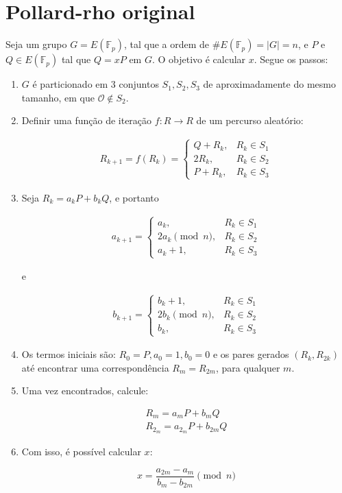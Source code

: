 \section{Pollard-rho original}
Seja um grupo $G = E(\mathbb{F}_p)$, tal que a ordem de $\#E(\mathbb{F}_p) = |G| = n$, e \(P\) e \(Q \in E(\mathbb{F}_p)\) tal que $Q = xP$ em \(G\). O objetivo é calcular \(x\). Segue os passos:

\begin{enumerate}
\item \(G\) é particionado em 3 conjuntos $S_1, S_2, S_3$ de aproximadamente do mesmo tamanho, em que $\mathcal{O} \notin S_2$.
\item Definir uma função de iteração $f : R \to R$ de um percurso aleatório:

\begin{eqnarray} \label{eq:walk}
R_{k+1} = f(R_k) =
\begin{cases}
Q + R_k, &R_k \in S_1 \\
2R_k, &R_k \in S_2 \\
P + R_k, &R_k \in S_3
\end{cases}
\end{eqnarray}

\item Seja $R_k = a_kP + b_kQ$, e portanto

\begin{eqnarray}
a_{k+1} =
\begin{cases}
a_k, &R_k \in S_1 \\
2a_k \pmod n, &R_k \in S_2 \\
a_k + 1, &R_k \in S_3
\end{cases}
\end{eqnarray}

e

\begin{eqnarray}
b_{k+1} =
\begin{cases}
b_k + 1, &R_k \in S_1 \\
2b_k \pmod n, &R_k \in S_2 \\
b_k, &R_k \in S_3
\end{cases}
\end{eqnarray}

\item Os termos iniciais são: $R_0 = P, a_0 = 1, b_0 = 0$ e os pares gerados $(R_k, R_{2k})$ até encontrar uma correspondência $R_m = R_{2m}$, para qualquer \(m\).

\item Uma vez encontrados, calcule:

\begin{eqnarray*}
R_m = a_mP + b_mQ \\
R_{2_m} = a_{2_m}P + b_{2m}Q
\end{eqnarray*}

\item Com isso, é possível calcular \(x\):

\begin{equation} \label{eq:x}
x = \frac{a_{2m} - a_m}{b_m - b_{2m}} \pmod n
\end{equation}

\end{enumerate}

